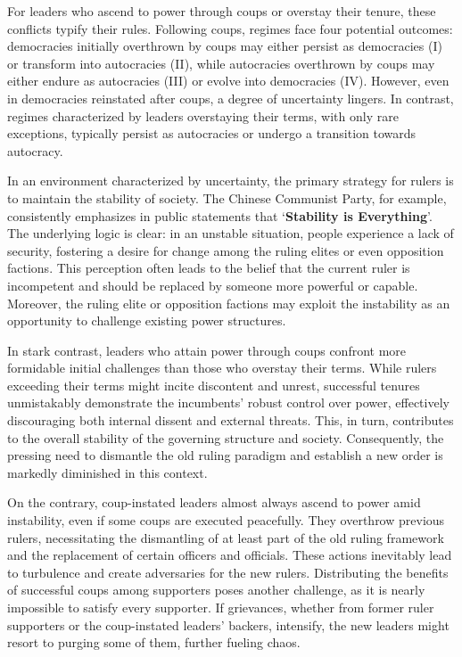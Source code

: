 \documentclass[
  12pt,
  a4paper,
  12pt]{article}
\begin{document}
For leaders who ascend to power through coups or overstay their tenure,
these conflicts typify their rules. Following coups, regimes face four
potential outcomes: democracies initially overthrown by coups may either
persist as democracies (I) or transform into autocracies (II), while
autocracies overthrown by coups may either endure as autocracies (III)
or evolve into democracies (IV). However, even in democracies reinstated
after coups, a degree of uncertainty lingers. In contrast, regimes
characterized by leaders overstaying their terms, with only rare
exceptions, typically persist as autocracies or undergo a transition
towards autocracy.

In an environment characterized by uncertainty, the primary strategy for
rulers is to maintain the stability of society. The Chinese Communist
Party, for example, consistently emphasizes in public statements that
`\textbf{Stability is Everything}'. The underlying logic is clear: in an
unstable situation, people experience a lack of security, fostering a
desire for change among the ruling elites or even opposition factions.
This perception often leads to the belief that the current ruler is
incompetent and should be replaced by someone more powerful or capable.
Moreover, the ruling elite or opposition factions may exploit the
instability as an opportunity to challenge existing power structures.

In stark contrast, leaders who attain power through coups confront more
formidable initial challenges than those who overstay their terms. While
rulers exceeding their terms might incite discontent and unrest,
successful tenures unmistakably demonstrate the incumbents' robust
control over power, effectively discouraging both internal dissent and
external threats. This, in turn, contributes to the overall stability of
the governing structure and society. Consequently, the pressing need to
dismantle the old ruling paradigm and establish a new order is markedly
diminished in this context.

On the contrary, coup-instated leaders almost always ascend to power
amid instability, even if some coups are executed peacefully. They
overthrow previous rulers, necessitating the dismantling of at least
part of the old ruling framework and the replacement of certain officers
and officials. These actions inevitably lead to turbulence and create
adversaries for the new rulers. Distributing the benefits of successful
coups among supporters poses another challenge, as it is nearly
impossible to satisfy every supporter. If grievances, whether from
former ruler supporters or the coup-instated leaders' backers,
intensify, the new leaders might resort to purging some of them, further
fueling chaos.
\end{document}
